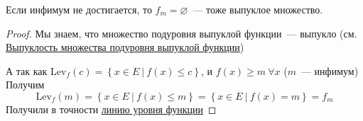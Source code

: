 

\begin{remark}
  Если инфимум не достигается, то $f_m = \varnothing$~--- тоже выпуклое множество.
\end{remark}

\begin{proof}
  Мы знаем, что множество подуровня выпуклой функции~--- выпукло (см. \hyperref[note:1CD538BF-6F40-472A-A670-D38F093E4DF1]{Выпуклость множества подуровня выпуклой функции})

  А так как $\mathrm{Lev}_f(c) = \left\{ x \in E\ |\ f(x) \le c  \right\}$, и $f(x) \ge m\ \forall x$ ($m$~--- инфимум) \\
  Получим
  \[
  \mathrm{Lev}_f(m) = \left\{ x  \in E\ |\ f(x) \le m \right\} = \left\{ x \in E\ |\ f(x) = m \right\} = f_m
  \]
  Получили в точности \hyperref[note:BF27A4AF-11BF-4A0D-85DF-5F7790BD58A9]{линию уровня функции}
\end{proof}
